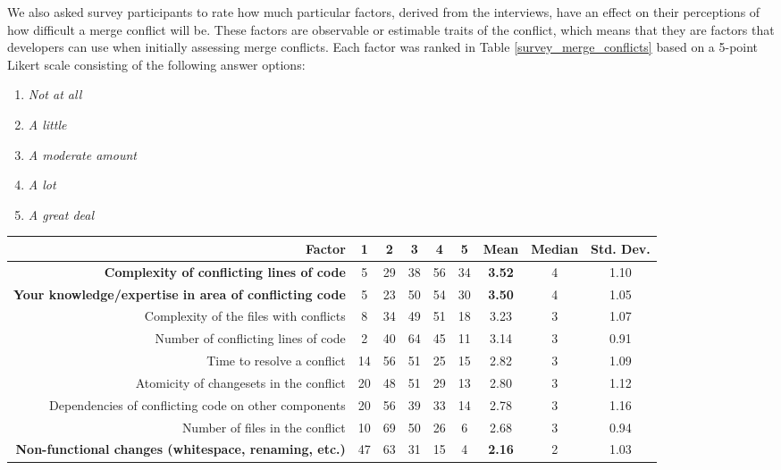 We also asked survey participants to rate how much particular factors, derived from the interviews, have an effect on their perceptions of how difficult a merge conflict will be. These factors are observable or estimable traits of the conflict, which means that they are factors that developers can use when initially assessing merge conflicts.
Each factor was ranked in Table \ref{survey_merge_conflicts} based on a 5-point Likert scale consisting of the following answer options:

\begin{enumerate}
	\item \textit{Not at all}
	\item \textit{A little}
	\item \textit{A moderate amount}
	\item \textit{A lot}
	\item \textit{A great deal}
\end{enumerate}

\begin{table*}[!]
\renewcommand{\arraystretch}{1.3}
\caption{Factors of Merge Conflict Difficulty from Survey}
\label{survey_merge_conflicts}
\centering
\begin{tabularx}{0.78\textwidth}{r | *5{c} | *3{c}}

\toprule
	Factor & 1 & 2 & 3 & 4 & 5 & Mean & Median & Std. Dev. \\
\midrule
	\textbf{Complexity of conflicting lines of code} & 5 & 29 & 38 & 56 & 34 & \textbf{3.52} & 4 & 1.10 \\
	\textbf{Your knowledge/expertise in area of conflicting code} & 5 & 23 & 50 & 54 & 30 & \textbf{3.50} & 4 & 1.05 \\
	Complexity of the files with conflicts & 8 & 34 & 49 & 51 & 18 & 3.23 & 3 & 1.07 \\
	Number of conflicting lines of code & 2 & 40 & 64 & 45 & 11 & 3.14 & 3 & 0.91 \\
	Time to resolve a conflict & 14 & 56 & 51 & 25 & 15 & 2.82 & 3 & 1.09 \\
	Atomicity of changesets in the conflict & 20 & 48 & 51 & 29 & 13 & 2.80 & 3 & 1.12 \\
	Dependencies of conflicting code on other components & 20 & 56 & 39 & 33 & 14 & 2.78 & 3 & 1.16 \\
	Number of files in the conflict & 10 & 69 & 50 & 26 & 6 & 2.68 & 3 & 0.94 \\
	\textbf{Non-functional changes (whitespace, renaming, etc.)} & 47 & 63 & 31 & 15 & 4 & \textbf{2.16} & 2 & 1.03 \\
\bottomrule
\end{tabularx}
\end{table*}

